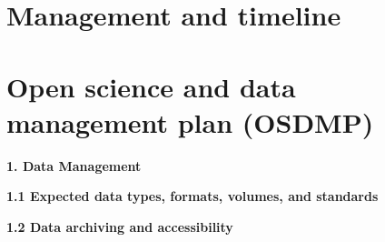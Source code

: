 \documentclass[12pt]{article}
\newcommand{\paragraphskip}{\medskip}
\renewcommand{\paragraph}[1]{\par\paragraphskip\noindent\textbf{#1}}
\begin{document}
\section*{Management and timeline}

\clearpage


\clearpage
\section*{Open science and data management plan (OSDMP)}
\paragraph{1. Data Management}

\paragraph{1.1 Expected data types, formats, volumes, and standards}

\paragraph{1.2 Data archiving and accessibility}
\end{document}
